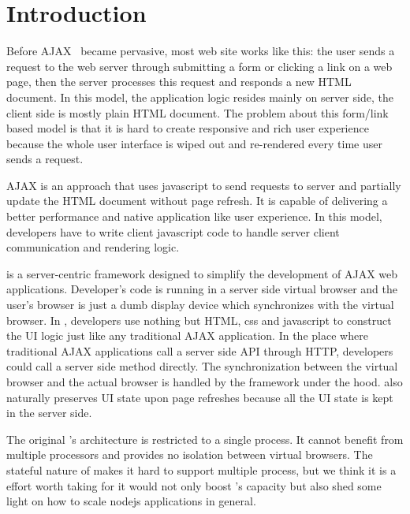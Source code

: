 \section{Introduction}
\label{sec:intro}

Before AJAX~\cite{garrett2005ajax} became pervasive, most web site works like this:
the user sends a request to the web server through submitting a form or clicking a link on a web page,
then the server processes this request and responds a new HTML document.
In this model, the application logic resides mainly on server side, the client side is mostly
plain HTML document.
The problem about this form/link based model is that it is hard
to create responsive and rich user experience because the whole user interface
is wiped out and re-rendered every time user sends a request.

AJAX is an approach that uses javascript to send requests to server
and partially update the HTML document without page refresh.
It is capable of delivering a better performance and native application like user experience.
In this model, developers have to write client javascript code to handle server client communication
and rendering logic. 


\cb{} is a server-centric framework designed to simplify the development of AJAX web applications.
Developer's code is running in a server side virtual browser and the user's browser is just
a dumb display device which synchronizes with the virtual browser.
In \cb{}, developers use nothing but HTML, css and javascript to construct the UI logic just like
any traditional AJAX application.
In the place where traditional AJAX applications call a server side API through HTTP,
developers could call a server side method directly.
The synchronization between the virtual browser and the actual browser is 
handled by the framework under the hood.
\cb{} also naturally preserves UI state upon page refreshes
because all the UI state is kept in the server side.





The original \cb{}'s architecture is restricted to a single process.
It cannot benefit from multiple processors and provides no isolation between virtual browsers.
The stateful nature of \cb{} makes it hard to support multiple process, 
but we think it is a effort worth taking for it would not only boost \cb{}'s capacity
but also shed some light on how to scale nodejs applications in general.




